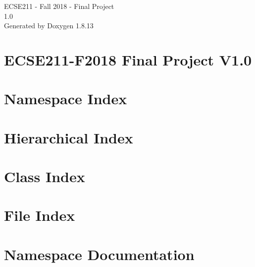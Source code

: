 \documentclass[twoside]{book}
\newcommand{\+}{\discretionary{\mbox{\scriptsize$\hookleftarrow$}}{}{}}
\newcommand{\clearemptydoublepage}{%
  \newpage{\pagestyle{empty}\cleardoublepage}%
}
\begin{document}
\hypersetup{pageanchor=false,
             bookmarksnumbered=true,
             pdfencoding=unicode
            }
\begin{titlepage}
\vspace*{7cm}
\begin{center}%
{\Large E\+C\+S\+E211 -\/ Fall 2018 -\/ Final Project \\[1ex]\large 1.\+0 }\\
\vspace*{1cm}
{\large Generated by Doxygen 1.8.13}\\
\end{center}
\end{titlepage}
\clearemptydoublepage
{}
\tableofcontents
\clearemptydoublepage
{}
\hypersetup{pageanchor=true}

\chapter{E\+C\+S\+E211-\/\+F2018 Final Project V1.0}
\label{index}\hypertarget{index}{}
\chapter{Namespace Index}

\chapter{Hierarchical Index}

\chapter{Class Index}

\chapter{File Index}

\chapter{Namespace Documentation}








\end{document}
